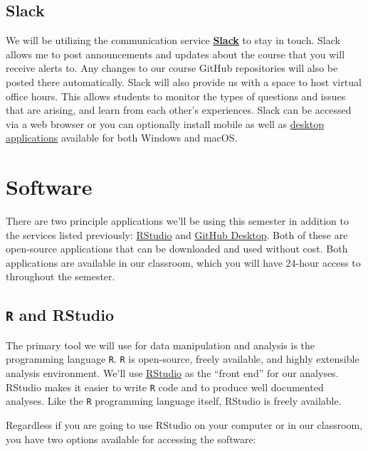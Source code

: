 \documentclass[]{book}
\theoremstyle{definition}
\theoremstyle{definition}
\theoremstyle{definition}
\theoremstyle{remark}
\begin{document}
\hypertarget{slack}{%
\subsection{Slack}\label{slack}}

We will be utilizing the communication service
\textbf{\href{https://slack.com}{Slack}} to stay in touch. Slack allows
me to post announcements and updates about the course that you will
receive alerts to. Any changes to our course GitHub repositories will
also be posted there automatically. Slack will also provide us with a
space to host virtual office hours. This allows students to monitor the
types of questions and issues that are arising, and learn from each
other's experiences. Slack can be accessed via a web browser or you can
optionally install mobile as well as
\href{https://slack.com/downloads/osx}{desktop applications} available
for both Windows and macOS.

\hypertarget{software}{%
\section{Software}\label{software}}

There are two principle applications we'll be using this semester in
addition to the services listed previously:
\href{https://www.rstudio.com}{RStudio} and
\href{https://desktop.github.com}{GitHub Desktop}. Both of these are
open-source applications that can be downloaded and used without cost.
Both applications are available in our classroom, which you will have
24-hour access to throughout the semester.

\hypertarget{r-and-rstudio}{%
\subsection{\texorpdfstring{\texttt{R} and
RStudio}{R and RStudio}}\label{r-and-rstudio}}

The primary tool we will use for data manipulation and analysis is the
programming language \texttt{R}. \texttt{R} is open-source, freely
available, and highly extensible analysis environment. We'll use
\href{https://www.rstudio.com}{RStudio} as the ``front end'' for our
analyses. RStudio makes it easier to write \texttt{R} code and to
produce well documented analyses. Like the \texttt{R} programming
language itself, RStudio is freely available.

Regardless if you are going to use RStudio on your computer or in our
classroom, you have two options available for accessing the software:
\end{document}
